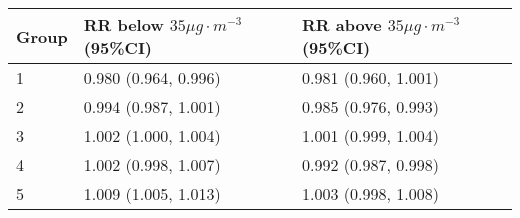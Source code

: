 \begin{tabular}{lll}
  \hline
Group & RR below $35 \mu g \cdot m^{-3}$ (95\%CI) & RR above $35 \mu g \cdot m^{-3}$ (95\%CI) \\ 
  \hline
   1 & 0.980 (0.964, 0.996) & 0.981 (0.960, 1.001) \\ 
     2 & 0.994 (0.987, 1.001) & 0.985 (0.976, 0.993) \\ 
     3 & 1.002 (1.000, 1.004) & 1.001 (0.999, 1.004) \\ 
     4 & 1.002 (0.998, 1.007) & 0.992 (0.987, 0.998) \\ 
     5 & 1.009 (1.005, 1.013) & 1.003 (0.998, 1.008) \\ 
   \hline
\end{tabular}

